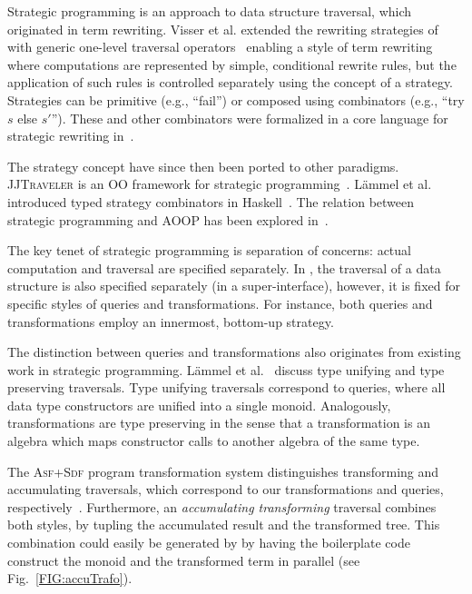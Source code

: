 Strategic programming is an approach to data structure traversal,
which originated in term
rewriting. Visser et al. extended the rewriting strategies of~\cite{borovansky1996elan} with generic one-level traversal operators~\cite{Visser:1998:BPO:289423.289425} enabling a style of term rewriting where computations are represented by simple, conditional rewrite rules, but
the application of such rules is controlled separately using the
concept of a strategy.  Strategies can be primitive (e.g., ``fail'')
or composed using combinators (e.g., ``try $s$ else $s'$'').  
These and other combinators were formalized in a  core language for strategic rewriting in~\cite{visser1998core}.

The
strategy concept have since then been ported to other paradigms.
\textsc{JJTraveler} is an OO framework for strategic
programming~\cite{visser01visitor}.  L\"ammel et al. introduced typed
strategy combinators in Haskell~\cite{lammel2002typed}. The relation
between strategic programming and AOOP has been explored
in~\cite{lammel2003strategic}. 

The key tenet of strategic programming is separation of concerns:  actual computation and traversal are specified separately.
In \name, the traversal of a data structure is also specified separately (in a super-interface), however, it is fixed for specific styles of queries and transformations.
For instance, both queries and transformations employ an innermost, bottom-up strategy.

The distinction between queries and transformations also originates from existing work in strategic programming.
L\"ammel et al.~\cite{lammel2002typed} discuss type unifying and type preserving traversals.
Type unifying traversals correspond to queries, where all data type constructors are unified into a single monoid.
Analogously, \name transformations are type preserving in the sense that a transformation is an algebra which maps constructor calls to another algebra of the same type.

The \textsc{Asf+Sdf} program transformation system distinguishes transforming and accumulating traversals, which correspond to our transformations and queries, respectively~\cite{vandenBrand:2003:TRT:941566.941568}.
Furthermore, an \textit{accumulating transforming} traversal combines both styles, by tupling the accumulated result and the transformed tree.
This combination could easily be generated by \name by having the boilerplate code construct the monoid and the transformed term in parallel (see Fig.~\ref{FIG:accuTrafo}).

